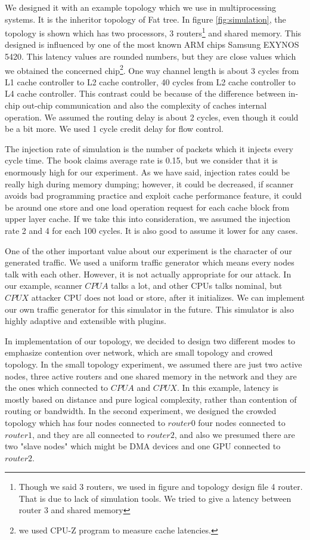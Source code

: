 We designed it with an example topology which we use in multiprocessing systems. It is the inheritor topology of Fat tree. In figure \ref{fig:simulation}, the topology is shown which has two processors, 3 routers\footnote{Though we said 3 routers, we used in figure and topology design file 4 router. That is due to lack of simulation tools. We tried to give a latency between router 3 and shared memory} and shared memory. This designed is influenced by one of the most known ARM chips Samsung EXYNOS 5420. This latency values are rounded numbers, but they are close values which we obtained the concerned chip\footnote{we used CPU-Z program to measure cache latencies.}. One way channel length is about 3 cycles from L1 cache controller to L2 cache controller, 40 cycles from L2 cache controller to L4 cache controller. This contrast could be because of the difference between in-chip out-chip communication and also the complexity of caches internal operation. We assumed the routing delay is about 2 cycles, even though it could be a bit more. We used 1 cycle credit delay for flow control.

The injection rate of simulation is the number of packets which it injects every cycle time. The book claims average rate is 0.15, but we consider that it is enormously high for our experiment. As we have said, injection rates could be really high during memory dumping; however, it could be decreased, if scanner avoids bad programming practice and exploit cache performance feature, it could be around one store and one load operation request  for each cache block from upper layer cache. If we take this into consideration, we assumed the injection rate 2 and 4 for each 100 cycles. It is also good to assume it lower for any cases. 

One of the other important value about our experiment is the character of our generated traffic. We used a uniform traffic generator which means every nodes talk with each other. However, it is not actually appropriate for our attack. In our example, scanner $CPUA$ talks a lot, and other CPUs talks nominal, but $CPUX$ attacker CPU does not load or store, after it initializes. We can implement our own traffic generator for this simulator in the future. This simulator is also highly adaptive and extensible with plugins.

In implementation of our topology, we decided to design two different modes to emphasize contention over network, which are small topology and crowed topology. In the small topology experiment, we assumed there are just two active nodes, three active routers and one shared memory in the network and they are the ones which connected to $CPUA$ and $CPUX$. In this example, latency is mostly based on distance and pure logical complexity, rather than contention of routing or bandwidth. In the second experiment, we designed the crowded topology which has four nodes connected to $router0$ four nodes connected to $router1$, and they are all connected to $router2$, and also we presumed there are two "slave nodes" which might be DMA devices and one GPU connected to $router2$.

